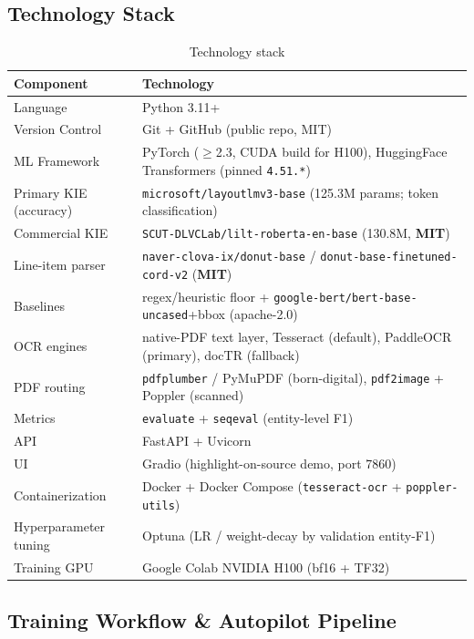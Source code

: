 \documentclass[12pt,a4paper]{article}
\begin{document}
\subsection{Technology Stack}

\begin{table}[H]
\centering
\caption{Technology stack}
\small
\begin{tabularx}{\linewidth}{@{} l L @{}}
\toprule
\textbf{Component} & \textbf{Technology} \\
\midrule
Language & Python 3.11+ \\
Version Control & Git + GitHub (public repo, MIT) \\
ML Framework & PyTorch ($\geq$2.3, CUDA build for H100), HuggingFace Transformers (pinned \texttt{4.51.*}) \\
Primary KIE (accuracy) & \texttt{microsoft/layoutlmv3-base} (125.3M params; token classification) \\
Commercial KIE & \texttt{SCUT-DLVCLab/lilt-roberta-en-base} (130.8M, \textbf{MIT}) \\
Line-item parser & \texttt{naver-clova-ix/donut-base} / \texttt{donut-base-finetuned-cord-v2} (\textbf{MIT}) \\
Baselines & regex/heuristic floor + \texttt{google-bert/bert-base-uncased}+bbox (apache-2.0) \\
OCR engines & native-PDF text layer, Tesseract (default), PaddleOCR (primary), docTR (fallback) \\
PDF routing & \texttt{pdfplumber} / PyMuPDF (born-digital), \texttt{pdf2image} + Poppler (scanned) \\
Metrics & \texttt{evaluate} + \texttt{seqeval} (entity-level F1) \\
API & FastAPI + Uvicorn \\
UI & Gradio (highlight-on-source demo, port 7860) \\
Containerization & Docker + Docker Compose (\texttt{tesseract-ocr} + \texttt{poppler-utils}) \\
Hyperparameter tuning & Optuna (LR / weight-decay by validation entity-F1) \\
Training GPU & Google Colab NVIDIA H100 (bf16 + TF32) \\
\bottomrule
\end{tabularx}
\end{table}

\subsection{Training Workflow \& Autopilot Pipeline}
\label{subsec:workflow}
\end{document}

